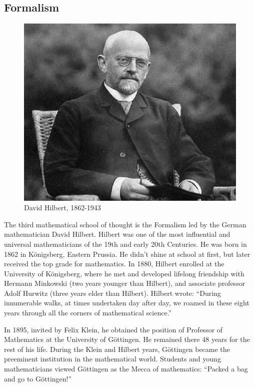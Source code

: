 \documentclass{article}
\begin{document}

\subsection{Formalism}

\begin{figure}
 \centering
 \includegraphics[scale=0.25]{img/Hilbert.jpg}
 \captionsetup{labelformat=empty}
 \caption{David Hilbert, 1862-1943}
 \label{fig:Hilbert}
\end{figure}

The third mathematical school of thought is the Formalism led by the German mathematician David Hilbert. Hilbert was one of the most influential and universal mathematicians of the 19th and early 20th Centuries. He was born in 1862 in Königsberg, Eastern Prussia. He didn't shine at school at first, but later received the top grade for mathematics. In 1880, Hilbert enrolled at the University of Königsberg, where he met and developed lifelong friendship with Hermann Minkowski (two years younger than Hilbert), and associate professor Adolf Hurwitz (three years elder than Hilbert). Hilbert wrote: ``During innumerable walks, at times undertaken day after day, we roamed in these eight years through all the corners of mathematical science.''

In 1895, invited by Felix Klein, he obtained the position of Professor of Mathematics at the University of Göttingen. He remained there 48 years for the rest of his life. During the Klein and Hilbert years, Göttingen became the preeminent institution in the mathematical world. Students and young mathematicians viewed Göttingen as the Mecca of mathematics: ``Packed a bag and go to Göttingen!''
\end{document}
